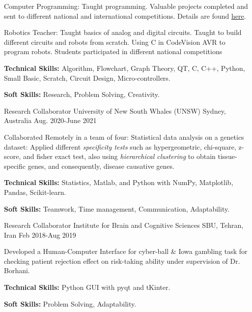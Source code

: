 \begin{cventries}
{\begin{cvitems}
        \item{Computer Programming:}
          {Taught programming. Valuable projects completed and sent to different national and international competitions. Details are found \href{https://sites.google.com/view/steacher/farzanegan-1-high-school/junior-programming}{here}.}
        \item{Robotics Teacher:}
          {Taught basics of analog and digital circuits. Taught to build different circuits and robots from scratch. Using C in CodeVision AVR to program robots. Students participated in different national competitions}
        \item {\textbf{Technical Skills:} Algorithm, Flowchart, Graph Theory, QT, C, C++, Python, Small Basic, Scratch, Circuit Design, Micro-controllers.}
        \item {\textbf{Soft Skills:} Research, Problem Solving, Creativity.}
      \end{cvitems}
    }
    
  \cventry
{Research Collaborator}  %
    {University of New South Whales (UNSW)} %
    {Sydney, Australia} %
    {Aug. 2020-June 2021} %
    {
      \begin{cvitems} %
        \item{Collaborated Remotely in a team of four: Statistical data analysis on a genetics dataset: Applied different \textit{specificity tests} such as hypergeometric, chi-square, z-score, and fisher exact test, also using \textit{hierarchical clustering} to obtain tissue-specific genes, and consequently, disease causative genes.}
        \item {\textbf{Technical Skills:} Statistics, Matlab, and Python with NumPy, Matplotlib, Pandas, Scikit-learn.}
        \item {\textbf{Soft Skills:} Teamwork, Time management, Communication, Adaptability.}
      \end{cvitems}
    }
 
  \cventry
    {Research Collaborator}  %
    {Institute for Brain and Cognitive Sciences} %
    {SBU, Tehran, Iran} %
    {Feb 2018-Aug 2019} %
    {
      \begin{cvitems} %
        \item{Developed a Human-Computer Interface for cyber-ball \& Iowa gambling task for checking patient rejection effect on risk-taking ability under supervision of Dr. Borhani.}
        \item {\textbf{Technical Skills:} Python GUI with pyqt and tKinter.}
        \item {\textbf{Soft Skills:} Problem Solving, Adaptability.}
      \end{cvitems}
    }


\end{cventries}
